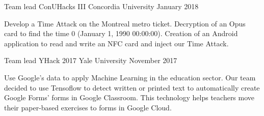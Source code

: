 

\begin{cventries}

  \cventry
    {Team lead}
    {ConUHacks III}
    {Concordia University}
    {January 2018}
    {
      \begin{cvitems}
        \item {Develop a Time Attack on the Montreal metro ticket. Decryption of an Opus card to find the time 0 (January 1, 1990 00:00:00). Creation of an Android application to read and write an NFC card and inject our Time Attack.}
      \end{cvitems}
    }

  \cventry
    {Team lead}
    {YHack 2017}
    {Yale University}
    {November 2017}
    {
      \begin{cvitems}
        \item {Use Google's data to apply Machine Learning in the education sector. Our team decided to use Tensoflow to detect written or printed text to automatically create Google Forms' forms in Google Classroom. This technology helps teachers move their paper-based exercises to forms in Google Cloud.}
      \end{cvitems}
    }

\end{cventries}